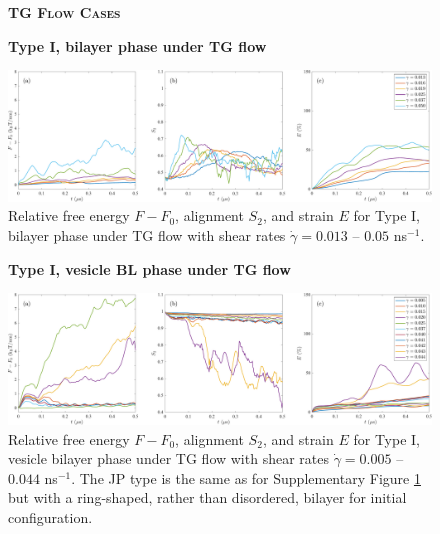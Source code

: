 \begin{figure}[h!]
\begin{center}
\textbf{\textsc{TG Flow Cases}}\par\medskip
\textbf{Type I, bilayer  phase under TG flow}\par\medskip
\includegraphics[width=\textwidth]{SMFigures/ULTGRaw.pdf}
\end{center}
\caption{
Relative free energy $F - F_0$,
alignment $S_2$, and strain $E$ for
Type I, bilayer phase under TG flow with shear rates $\dot\gamma=0.013$ -- $0.05$ ns$^{-1}$.
}
\label{fig:ultgraw}
\end{figure}


\begin{figure}[h!]
\begin{center}
\textbf{Type I, vesicle BL phase under TG flow}\par\medskip
\includegraphics[width=\textwidth]{SMFigures/VeTGRaw.pdf}
\end{center}
\caption{
Relative free energy $F - F_0$,
alignment $S_2$, and strain $E$ for
Type I, vesicle bilayer phase under TG flow with shear rates $\dot\gamma=0.005$ -- $0.044$ ns$^{-1}$.
The JP type is the same as for Supplementary Figure \ref{fig:ultgraw} but with a
ring-shaped, rather than disordered, bilayer for initial configuration.  
}
\label{fig:vetgraw}
\end{figure}




